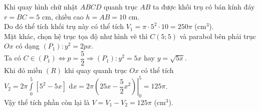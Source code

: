 \begin{bt}
{\begin{center}
	\end{center}
	Khi quay hình chữ nhật $ABCD$ quanh trục $AB$ ta được khối trụ có bán kính đáy $r=BC=5$ cm, chiều cao $h=AB=10$ cm.\\
	Do đó thể tích khối trụ này có thể tích $V_1=\pi \cdot 5^2\cdot 10=250\pi$ (cm$^3$).\\
	Mặt khác, chọn hệ trục tọa độ như hình vẽ thì $C(5;5)$ và parabol bên phải trục $Ox$ có dạng $(P_1)\colon y^2=2px$.\\
	Ta có $C\in (P_1)\Leftrightarrow p=\dfrac{5}{2}
	\Rightarrow (P_1)\colon y^2=5x$ hay $y=\sqrt{5x}$.\\
	Khi đó miền $(R)$ khi quay quanh trục $Ox$ có thể tích $V_2=2\pi \displaystyle \int\limits_0^5 \left[ {5^2}-5x \right]\,\mathrm{\,d}x=2\pi \left. \left( 25x-\dfrac{5}{2}{x^2} \right) \right|_0^5=125\pi $.\\
	Vậy thể tích phần còn lại là $V=V_1-V_2=125\pi$ (cm$^3$).\\
}
	\end{bt}

